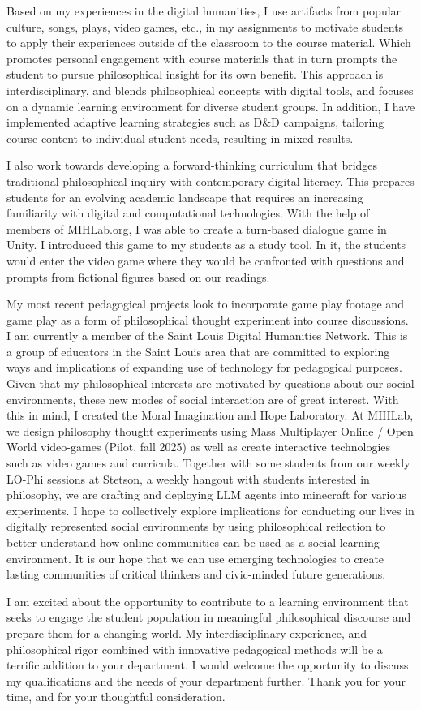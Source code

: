 \documentclass[
  letterpaper,
  DIV=11,
  numbers=noendperiod]{scrartcl}
\begin{document}
Based on my experiences in the digital humanities, I use artifacts from
popular culture, songs, plays, video games, etc., in my assignments to
motivate students to apply their experiences outside of the classroom to
the course material. Which promotes personal engagement with course
materials that in turn prompts the student to pursue philosophical
insight for its own benefit. This approach is interdisciplinary, and
blends philosophical concepts with digital tools, and focuses on a
dynamic learning environment for diverse student groups. In addition, I
have implemented adaptive learning strategies such as D\&D campaigns,
tailoring course content to individual student needs, resulting in mixed
results.

I also work towards developing a forward-thinking curriculum that
bridges traditional philosophical inquiry with contemporary digital
literacy. This prepares students for an evolving academic landscape that
requires an increasing familiarity with digital and computational
technologies. With the help of members of MIHLab.org, I was able to
create a turn-based dialogue game in Unity. I introduced this game to my
students as a study tool. In it, the students would enter the video game
where they would be confronted with questions and prompts from fictional
figures based on our readings.

My most recent pedagogical projects look to incorporate game play
footage and game play as a form of philosophical thought experiment into
course discussions. I am currently a member of the Saint Louis Digital
Humanities Network. This is a group of educators in the Saint Louis area
that are committed to exploring ways and implications of expanding use
of technology for pedagogical purposes. Given that my philosophical
interests are motivated by questions about our social environments,
these new modes of social interaction are of great interest. With this
in mind, I created the Moral Imagination and Hope Laboratory. At MIHLab,
we design philosophy thought experiments using Mass Multiplayer Online /
Open World video-games (Pilot, fall 2025) as well as create interactive
technologies such as video games and curricula. Together with some
students from our weekly LO-Phi sessions at Stetson, a weekly hangout
with students interested in philosophy, we are crafting and deploying
LLM agents into minecraft for various experiments. I hope to
collectively explore implications for conducting our lives in digitally
represented social environments by using philosophical reflection to
better understand how online communities can be used as a social
learning environment. It is our hope that we can use emerging
technologies to create lasting communities of critical thinkers and
civic-minded future generations.

I am excited about the opportunity to contribute to a learning
environment that seeks to engage the student population in meaningful
philosophical discourse and prepare them for a changing world. My
interdisciplinary experience, and philosophical rigor combined with
innovative pedagogical methods will be a terrific addition to your
department. I would welcome the opportunity to discuss my qualifications
and the needs of your department further. Thank you for your time, and
for your thoughtful consideration.
\end{document}
